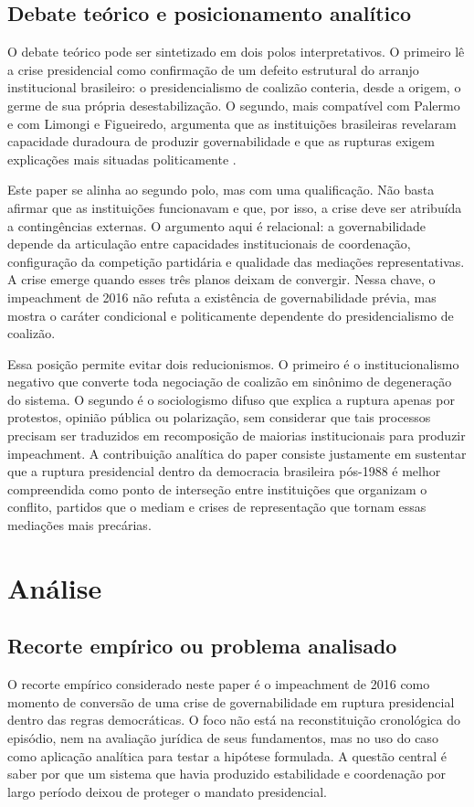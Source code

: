 \documentclass[12pt,a4paper]{article}
\begin{document}
\subsection{Debate teórico e posicionamento analítico}
\label{sec:orgad9bf61}
O debate teórico pode ser sintetizado em dois polos interpretativos. O primeiro lê a crise presidencial como confirmação de um defeito estrutural do arranjo institucional brasileiro: o presidencialismo de coalizão conteria, desde a origem, o germe de sua própria desestabilização. O segundo, mais compatível com Palermo e com Limongi e Figueiredo, argumenta que as instituições brasileiras revelaram capacidade duradoura de produzir governabilidade e que as rupturas exigem explicações mais situadas politicamente \textcite{palermo2000_como_se} \textcite{limongi2017_a_crise}.

Este paper se alinha ao segundo polo, mas com uma qualificação. Não basta afirmar que as instituições funcionavam e que, por isso, a crise deve ser atribuída a contingências externas. O argumento aqui é relacional: a governabilidade depende da articulação entre capacidades institucionais de coordenação, configuração da competição partidária e qualidade das mediações representativas. A crise emerge quando esses três planos deixam de convergir. Nessa chave, o impeachment de 2016 não refuta a existência de governabilidade prévia, mas mostra o caráter condicional e politicamente dependente do presidencialismo de coalizão.

Essa posição permite evitar dois reducionismos. O primeiro é o institucionalismo negativo que converte toda negociação de coalizão em sinônimo de degeneração do sistema. O segundo é o sociologismo difuso que explica a ruptura apenas por protestos, opinião pública ou polarização, sem considerar que tais processos precisam ser traduzidos em recomposição de maiorias institucionais para produzir impeachment. A contribuição analítica do paper consiste justamente em sustentar que a ruptura presidencial dentro da democracia brasileira pós-1988 é melhor compreendida como ponto de interseção entre instituições que organizam o conflito, partidos que o mediam e crises de representação que tornam essas mediações mais precárias.

\section{Análise}
\label{sec:orga113bd2}
\subsection{Recorte empírico ou problema analisado}
\label{sec:org965e0f9}
O recorte empírico considerado neste paper é o impeachment de 2016 como momento de conversão de uma crise de governabilidade em ruptura presidencial dentro das regras democráticas. O foco não está na reconstituição cronológica do episódio, nem na avaliação jurídica de seus fundamentos, mas no uso do caso como aplicação analítica para testar a hipótese formulada. A questão central é saber por que um sistema que havia produzido estabilidade e coordenação por largo período deixou de proteger o mandato presidencial.
\end{document}
